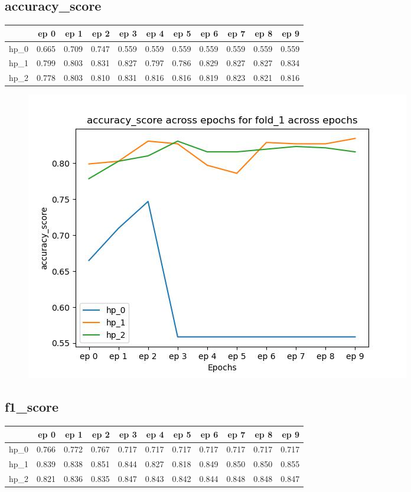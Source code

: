 \documentclass{article}
\begin{document}
\subsection{accuracy\_score}
\begin{tabular}{lrrrrrrrrrr}
\toprule
{} &   ep 0 &   ep 1 &   ep 2 &   ep 3 &   ep 4 &   ep 5 &   ep 6 &   ep 7 &   ep 8 &   ep 9 \\
\midrule
hp\_0 &  0.665 &  0.709 &  0.747 &  0.559 &  0.559 &  0.559 &  0.559 &  0.559 &  0.559 &  0.559 \\
hp\_1 &  0.799 &  0.803 &  0.831 &  0.827 &  0.797 &  0.786 &  0.829 &  0.827 &  0.827 &  0.834 \\
hp\_2 &  0.778 &  0.803 &  0.810 &  0.831 &  0.816 &  0.816 &  0.819 &  0.823 &  0.821 &  0.816 \\
\bottomrule
\end{tabular}

\begin{figure}[H]
\includegraphics[scale = 0.75]{fold_1/accuracy_score}
\end{figure}
\subsection{f1\_score}
\begin{tabular}{lrrrrrrrrrr}
\toprule
{} &   ep 0 &   ep 1 &   ep 2 &   ep 3 &   ep 4 &   ep 5 &   ep 6 &   ep 7 &   ep 8 &   ep 9 \\
\midrule
hp\_0 &  0.766 &  0.772 &  0.767 &  0.717 &  0.717 &  0.717 &  0.717 &  0.717 &  0.717 &  0.717 \\
hp\_1 &  0.839 &  0.838 &  0.851 &  0.844 &  0.827 &  0.818 &  0.849 &  0.850 &  0.850 &  0.855 \\
hp\_2 &  0.821 &  0.836 &  0.835 &  0.847 &  0.843 &  0.842 &  0.844 &  0.848 &  0.848 &  0.847 \\
\bottomrule
\end{tabular}
\end{document}
